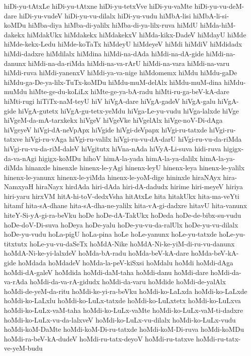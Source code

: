 {hiDi-yu-tAtxLe
hiDi-yu-tAtxne
hiDi-yu-tetxVve
hiDi-yu-vaMte
hiDi-yu-vu-deM-dare
hiDi-yu-vudeV
hiDi-yu-vu-dilalx
hiDi-yu-vudu
hiMbA-lisi
hiMbA-li-si-koMDu
hiMba-diya
hiMba-di-yalilx
hiMba-di-ya-lilx-ruva
hiMdU
hiMda-hiM-dakekx
hiMdakUkx
hiMdakekx
hiMdakekxV
hiMda-kikx-DadeV
hiMdayU
hiMde
hiMde-kekx-Ledu
hiMde-koTaTx
hiMdeyU
hiMdeyeV
hiMdi
hiMdiV
hiMdidadx
hiMdi-dadxre
hiMdilalx
hiMdina
hiMdi-na-dAda
hiMdi-na-dA-gide
hiMdi-na-danunx
hiMdi-na-da-riMda
hiMdi-na-va-rArU
hiMdi-na-vara
hiMdi-na-varu
hiMdi-ruva
hiMdi-yanenxV
hiMdi-ya-va-nige
hiMdomemx
hiMdu
hiMdu-gaDe
hiMdu-ga-De-ya-lilx-TuTx-koMDu
hiMdu-muM-delAlx
hiMdu-muM-dina
hiMdu-muMdu
hiMte-ge-du-koLiLx
hiMte-ge-ya-bA-radu
hiMti-ru-ga-beV-kA-dare
hiMti-rugi
hiTiTx-naM-teyU
hiV
hiVgA-dare
hiVgA-gadeV
hiVgA-galu
hiVgA-gide
hiVgA-gutetx
hiVgA-gu-tetx-yeMdu
hiVga-Le-yu-vudu
hiVga-lalxde
hiVge
hiVgeM-da-mA-tarxkekx
hiVgeV
hiVgeVke
hiVgelAlx
hiVge-noV-Di-dAga
hiVgeyeV
hiVgi-dA-neVpApx
hiVgide
hiVgi-deVpapx
hiVgi-ru-tatxde
hiVgi-ru-tatxve
hiVgi-ru-vAga
hiVgi-ru-valilx
hiVgi-ru-vu-dA-darU
hiVgi-ru-vu-da-riMda
hiVgi-ru-vu-da-riM-daleV
hiVgitutx
hiVna-nAda
hiVyA-Li-suva
hidi-ruva
higigx-da-va-nAgi
higigx-koMDu
hihoV
himA-la-yada
himA-la-ya-dalilx
himA-la-ya-diMda
hinanxle
hinenxle
hinenx-le-yAgi
hinenx-leyU
hinenx-leya
hinenx-le-yalilx
hinenx-le-yanunx
hinenx-le-yiMda
hinenx-le-yoM-dige
hininxle
hiraNAyx
hira-NamxyaH
hiraNayx
hirdAda
hiri-dAda
hiri-dA-dadudx
hirime
hiri-meyeV
hiriya
hiri-yaru
hirxVM
hitA-hi-toV-dedxVsha
hitAtxLe
hita
hitakUkx
hita-ma-veYti
hitamf
hita-sA-dhane
hita-sA-dha-ne-yalilx
hita-vA-gi-dadxre
hitavU
hita-vanunx
hiteY-Si-yA-gi-ra-beVku
hoDe
hoDe-dA-TakUkx
hoDeda
hoDe-de-bibx-su-vudu
hoDe-doV-Di-suva
hoDeya
hoDe-yalu
hoDe-yu-vu-da-ralUlx
hoDe-yu-vu-dilalx
hoDe-yu-vudu
hoLa-pigU
hoLa-pina
hoLe
hoLe-yanunx
hoLe-yu-tatxde
hoLe-yu-titxtutx
hoLe-yu-vu-daSeTx
hoMdA-Nike
hoMdA-Ni-ke-yiM-di-ru-vu-danunx
hoMdA-Ni-ke-yi-lalxdeV
hoMda-bA-radu
hoMda-beV-kA-dare
hoMda-beV-kA-gide
hoMdada
hoMdadeV
hoMda-la-peV-kiSxsi
hoMdalu
hoMdi
hoMdi-dAga
hoMdi-dA-galeV
hoMdida
hoMdi-daM-taha
hoMdi-danu
hoMdi-dare
hoMdi-da-va-rAda
hoMdi-da-va-rA-gidudx
hoMdi-da-varu
hoMdide
hoMdi-de-yalAlx
hoMdi-de-yeM-da-ritu
hoMdi-ke-yi-ra-beVku
hoMdi-ko-LaLxda
hoMdi-ko-LaLxde
hoMdi-ko-LaLxlu
hoMdi-ko-LuLx-tatxde
hoMdi-ko-LuLxtetx
hoMdi-ko-LuLxva
hoMdi-ko-LuLx-vaM-taha
hoMdi-ko-LuLx-vaMte
hoMdi-ko-LuLx-vaM-ti-dadxre
hoMdi-ko-LuLx-vu-da-lalxveV
hoMdi-ko-LuLx-vu-dilalx
hoMdi-ko-LuLx-vudu
hoMdi-koM-DaMte
hoMdi-koM-Di-ru-tatxde
hoMdi-koM-Di-ruva
hoMdi-koMDu
hoMdi-ra-beV-kA-dudeV
hoMdi-ru-tatx-deyoV
hoMdi-ru-tatxve
hoMdi-ru-tatx-ve-yeM-budu
}
